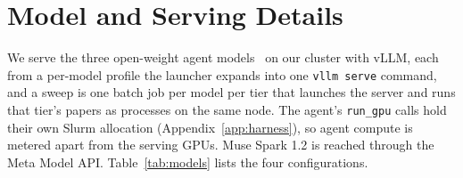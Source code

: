 \section{Model and Serving Details}
\label{app:models}

We serve the three open-weight agent
models~\citep{deepseekai2026flashcard,qwen2026fp8card,cyankiwi2026minimaxawq,lin2023awq} on our cluster with vLLM, each from
a per-model profile the launcher expands into one \texttt{vllm serve} command,
and a sweep is one batch job per model per tier that launches the server and
runs that tier's papers as processes on the same node. The agent's \texttt{run\_gpu}
calls hold their own Slurm allocation (Appendix~\ref{app:harness}), so agent
compute is metered apart from the serving GPUs. Muse Spark 1.2 is reached
through the Meta Model API.
Table~\ref{tab:models} lists the four configurations.


